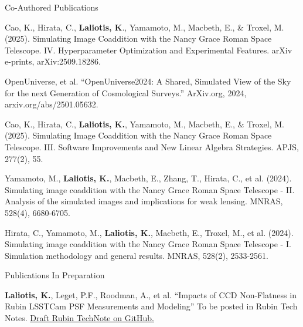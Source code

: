 \documentclass{resume} %
\begin{document}

\begin{rSection}{Co-Authored Publications}
\vspace{.3em}

\begin{rSubsection}{}{}{}{}

\item Cao, K., Hirata, C., \textbf{Laliotis, K}., Yamamoto, M., Macbeth, E., \& Troxel, M. (2025). Simulating Image Coaddition with the Nancy Grace Roman Space Telescope. IV. Hyperparameter Optimization and Experimental Features. arXiv e-prints, arXiv:2509.18286.
\\
\item OpenUniverse, et al. “OpenUniverse2024: A Shared, Simulated View of the Sky for the next Generation of Cosmological Surveys.” ArXiv.org, 2024, arxiv.org/abs/2501.05632. 
\\
\item Cao, K., Hirata, C., \textbf{Laliotis, K.}, Yamamoto, M., Macbeth, E., \& Troxel, M. (2025). Simulating Image Coaddition with the Nancy Grace Roman Space Telescope. III. Software Improvements and New Linear Algebra Strategies. APJS, 277(2), 55.
\\
\item Yamamoto, M., \textbf{Laliotis, K.}, Macbeth, E., Zhang, T., Hirata, C., et al. (2024). Simulating image coaddition with the Nancy Grace Roman Space Telescope - II. Analysis of the simulated images and implications for weak lensing. MNRAS, 528(4), 6680-6705.
\\
\item Hirata, C., Yamamoto, M., \textbf{Laliotis, K.}, Macbeth, E., Troxel, M., et al. (2024). Simulating image coaddition with the Nancy Grace Roman Space Telescope - I. Simulation methodology and general results. MNRAS, 528(2), 2533-2561.


\end{rSubsection}

\end{rSection}


\begin{rSection}{Publications In Preparation}

\vspace{.3em}

\begin{rSubsection}{}{}{}{}
    
\item \textbf{Laliotis, K.}, Leget, P.F., Roodman, A., et al. “Impacts of CCD Non-Flatness in Rubin LSSTCam PSF Measurements and Modeling” To be posted in Rubin Tech Notes. \href{https://github.com/kklaliotis/rtn-108}{Draft Rubin TechNote on GitHub.}

\end{rSubsection}


\end{rSection}
\end{document}
